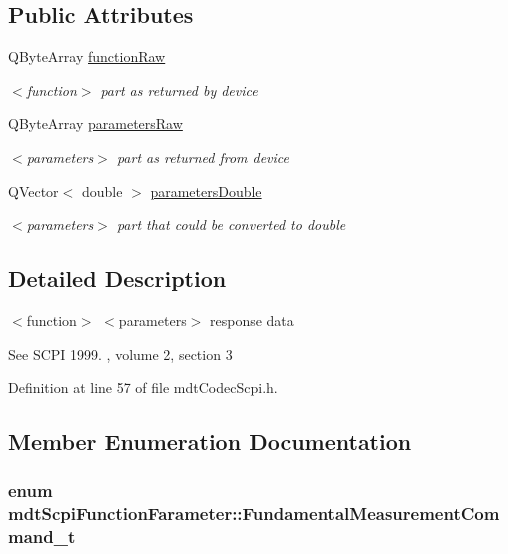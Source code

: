\subsection*{Public Attributes}
\begin{DoxyCompactItemize}
\item 
Q\-Byte\-Array \hyperlink{structmdt_scpi_function_farameter_a7f57db2184352d4b25d9a2cd58202bf4}{function\-Raw}
\begin{DoxyCompactList}\small\item\em $<$function$>$ part as returned by device \end{DoxyCompactList}\item 
Q\-Byte\-Array \hyperlink{structmdt_scpi_function_farameter_a6e862b52cdb9e1d5c45123b6382db675}{parameters\-Raw}
\begin{DoxyCompactList}\small\item\em $<$parameters$>$ part as returned from device \end{DoxyCompactList}\item 
Q\-Vector$<$ double $>$ \hyperlink{structmdt_scpi_function_farameter_add88cf91c824eb5c317f21a3f2c77503}{parameters\-Double}
\begin{DoxyCompactList}\small\item\em $<$parameters$>$ part that could be converted to double \end{DoxyCompactList}\end{DoxyCompactItemize}


\subsection{Detailed Description}
$<$function$>$ $<$parameters$>$ response data 

See S\-C\-P\-I 1999. , volume 2, section 3 

Definition at line 57 of file mdt\-Codec\-Scpi.\-h.



\subsection{Member Enumeration Documentation}
\hypertarget{structmdt_scpi_function_farameter_a6c66a5f0deed788e511aa28e3683cf7e}{
\subsubsection[{Fundamental\-Measurement\-Command\-\_\-t}]{\setlength{\rightskip}{0pt plus 5cm}enum {\bf mdt\-Scpi\-Function\-Farameter\-::\-Fundamental\-Measurement\-Command\-\_\-t}\hspace{0.3cm}{\ttfamily [strong]}}}\label{structmdt_scpi_function_farameter_a6c66a5f0deed788e511aa28e3683cf7e}


